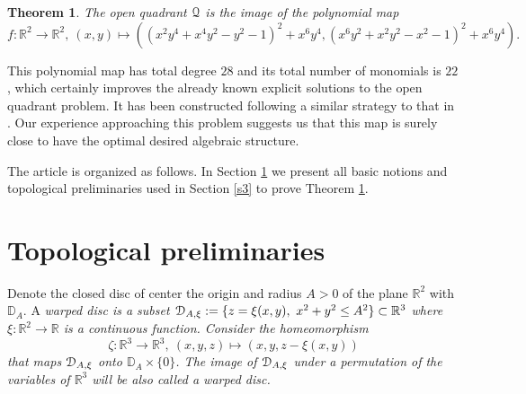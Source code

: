 \documentclass[10pt,twoside]{homg3} %
\newtheorem{thm}{Theorem}[section]
\newcommand{\Dd}{{\EuScript D}}
\newcommand{\Qq}{{\EuScript Q}}
\renewcommand{\R}{\mathbb{R}}
\begin{document}
\begin{thm}\label{main}
The open quadrant $\Qq$ is the image of the polynomial map
$$
f:\R^2\to\R^2,\ (x,y)\mapsto((x^2y^4+x^4y^2-y^2-1)^2+x^6y^4,(x^6y^2+x^2y^2-x^2-1)^2+x^6y^4).
$$
\end{thm}

This polynomial map has total degree $28$ and its total number of monomials is $22$, which certainly improves the already known explicit solutions to the open quadrant problem. It has been constructed following a similar strategy to that in \cite[\S3]{fg1}. Our experience approaching this problem suggests us that this map is surely close to have the optimal desired algebraic structure.

The article is organized as follows. In Section \ref{s2} we present all basic notions and topological preliminaries used in Section \ref{s3} to prove Theorem \ref{main}.

\section{Topological preliminaries}\label{s2}

Denote the closed disc of center the origin and radius $A>0$ of the plane $\R^2$ with ${\mathbb D}_A$. A \em warped disc \em is a subset $\Dd_{A,\xi}:=\{z=\xi(x,y),\ x^2+y^2\le A^2\}\subset\R^3$ where $\xi:\R^2\to\R$ is a continuous function. Consider the homeomorphism
$$
\zeta:\R^3\to\R^3,\ (x,y,z)\mapsto(x,y,z-\xi(x,y))
$$
that maps $\Dd_{A,\xi}$ onto ${\mathbb D}_A\times\{0\}$. The image of $\Dd_{A,\xi}$ under a permutation of the variables of $\R^3$ will be also called a warped disc.

\end{document}
